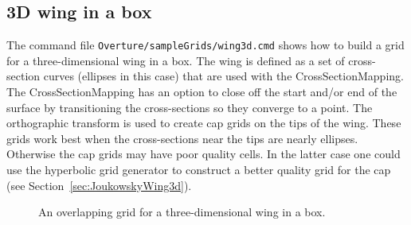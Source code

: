 \documentclass[xcolor=rgb,svgnames,dvipsnames]{article}
\newcommand{\figures}{\homeHenshaw/OvertureFigures}
\begin{document}
\subsection{3D wing in a box}\label{sec:3dWingInABox}

The command file {\tt Overture/sampleGrids/wing3d.cmd} shows how to build a grid 
for a three-dimensional wing in a box. The wing is defined as a set of cross-section curves (ellipses in
this case)
that are used with the CrossSectionMapping. The CrossSectionMapping has an option to 
close off the start and/or end of the surface by transitioning the cross-sections
so they converge to a point. The orthographic transform is used to create cap grids on
the tips of the wing. These grids work best when the cross-sections near the tips are
nearly ellipses. Otherwise the cap grids may have poor quality cells. In the latter case
one could use the hyperbolic grid generator to construct a better quality grid for
the cap (see Section~\ref{sec:JoukowskyWing3d}). 

{
\newcommand{\figWidthd}{7cm}
\newcommand{\trimfig}[2]{\trimPlot{#1}{#2}{.0}{.0}{.15}{.15}}
\begin{figure}[hbt]
\begin{center}
\end{center}
\caption{An overlapping grid for a three-dimensional wing in a box. } \label{fig:wing3d}
\end{figure}
}


\end{document}
